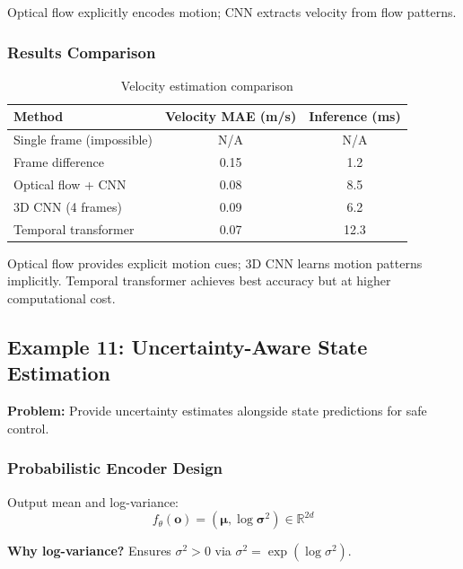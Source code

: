 Optical flow explicitly encodes motion; CNN extracts velocity from flow patterns.

\subsubsection{Results Comparison}

\begin{table}[htbp]
\centering
\caption{Velocity estimation comparison}
\label{tab:velocity_estimation}
\begin{tabular}{lcc}
\toprule
\textbf{Method} & \textbf{Velocity MAE (m/s)} & \textbf{Inference (ms)} \\
\midrule
Single frame (impossible) & N/A & N/A \\
Frame difference & 0.15 & 1.2 \\
Optical flow + CNN & 0.08 & 8.5 \\
3D CNN (4 frames) & 0.09 & 6.2 \\
Temporal transformer & 0.07 & 12.3 \\
\bottomrule
\end{tabular}
\end{table}

Optical flow provides explicit motion cues; 3D CNN learns motion patterns implicitly. Temporal transformer achieves best accuracy but at higher computational cost.


\subsection{Example 11: Uncertainty-Aware State Estimation}

\textbf{Problem:} Provide uncertainty estimates alongside state predictions for safe control.

\subsubsection{Probabilistic Encoder Design}

Output mean and log-variance:
\begin{equation}
f_\theta(\mathbf{o}) = (\boldsymbol{\mu}, \log \boldsymbol{\sigma}^2) \in \mathbb{R}^{2d}
\label{eq:prob_encoder}
\end{equation}

\textbf{Why log-variance?} Ensures $\sigma^2 > 0$ via $\sigma^2 = \exp(\log \sigma^2)$.

